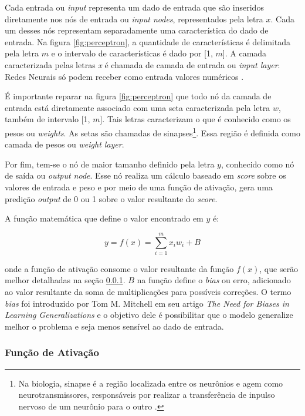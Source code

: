 Cada entrada ou \textit{input} representa um dado de entrada que são inseridos diretamente nos nós de entrada ou \textit{input nodes}, representados pela letra \(x\). Cada um desses nós representam separadamente uma característica do dado de entrada. Na figura \ref{fig:perceptron}, a quantidade de características é delimitada pela letra \(m\) e o intervalo de características é dado por [1, \(m\)]. A camada caracterizada pelas letras \textit{x} é chamada de camada de entrada ou \textit{input layer}. Redes Neurais só podem receber como entrada valores numéricos \cite{deep-learning-book}.

É importante reparar na figura \ref{fig:perceptron} que todo nó da camada de entrada está diretamente associado com uma seta caracterizada pela letra \(w\), também de intervalo [1, \(m\)]. Tais letras caracterizam o que é conhecido como os pesos ou \textit{weights}. As setas são chamadas de sinapses\footnote
{
  Na biologia, sinapse é a região localizada entre os neurônios e agem como neurotransmissores, responsáveis por realizar a transferência de inpulso nervoso de um neurônio para o outro \cite{synapses}.
}.
Essa região é definida como camada de pesos ou \textit{weight layer}.

Por fim, tem-se o nó de maior tamanho definido pela letra \(y\), conhecido como nó de saída ou \textit{output node}. Esse nó realiza um cálculo baseado em \textit{score} sobre os valores de entrada e peso e por meio de uma função de ativação, gera uma predição \textit{output} de 0 ou 1 sobre o valor resultante do \textit{score}.

A função matemática que define o valor encontrado em \(y\) é:

\[ y = f(x) = \sum_{i=1}^{m} x_iw_i + B\]

onde a função de ativação consome o valor resultante da função \(f(x)\), que serão melhor detalhadas na seção \ref{sssec:activation-func}. \(B\) na função define o \textit{bias} ou erro, adicionado ao valor resultante da soma de multiplicações para possíveis correções. O termo \textit{bias} foi introduzido por Tom M. Mitchell em seu artigo \textit{The Need for Biases in Learning Generalizations} \cite{biases} e o objetivo dele é possibilitar que o modelo generalize melhor o problema e seja menos sensível ao dado de entrada.

\subsubsection{Função de Ativação} \label{sssec:activation-func}

